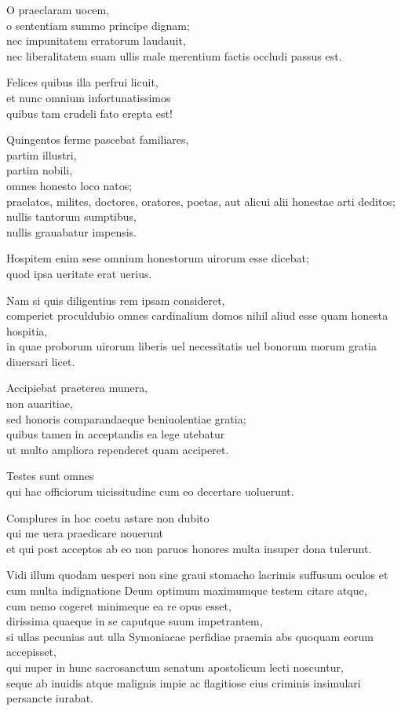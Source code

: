 \documentclass[a5paper,twoside]{article}
\begin{document}
O praeclaram uocem, \\
o sententiam summo principe dignam; \\
nec impunitatem erratorum laudauit, \\
nec liberalitatem suam ullis male merentium factis occludi passus est. 

Felices quibus illa perfrui licuit, \\
et nunc omnium infortunatissimos \\
quibus tam crudeli fato erepta est! 

Quingentos ferme pascebat familiares, \\
partim illustri, \\
partim nobili, \\
omnes honesto loco natos; \\
praelatos, milites, doctores, oratores, poetas, aut alicui alii honestae arti deditos; \\
nullis tantorum sumptibus, \\
nullis grauabatur impensis. 

Hospitem enim sese omnium honestorum uirorum esse dicebat; \\
quod ipsa ueritate erat uerius. 

Nam si quis diligentius rem ipsam consideret, \\
comperiet proculdubio omnes cardinalium domos nihil aliud esse quam honesta hospitia, \\
in quae proborum uirorum liberis uel necessitatis uel bonorum morum gratia diuersari licet.

Accipiebat praeterea munera, \\
non auaritiae, \\
sed honoris comparandaeque beniuolentiae gratia; \\
quibus tamen in acceptandis ea lege utebatur \\
ut multo ampliora rependeret quam acciperet. 

Testes sunt omnes \\
qui hac officiorum uicissitudine cum eo decertare uoluerunt. 

Complures in hoc coetu astare non dubito \\
qui me uera praedicare nouerunt \\
et qui post acceptos ab eo non paruos honores multa insuper dona tulerunt.

Vidi illum quodam uesperi non sine graui stomacho lacrimis suffusum oculos et cum multa indignatione Deum optimum maximumque testem citare atque, \\
cum nemo cogeret minimeque ea re opus esset, \\
dirissima quaeque in se caputque suum impetrantem, \\
si ullas pecunias aut ulla Symoniacae perfidiae praemia abs quoquam eorum accepisset, \\
qui nuper in hunc sacrosanctum senatum apostolicum lecti noscuntur, \\
seque ab inuidis atque malignis impie ac flagitiose eius criminis insimulari persancte iurabat. 
\end{document}
